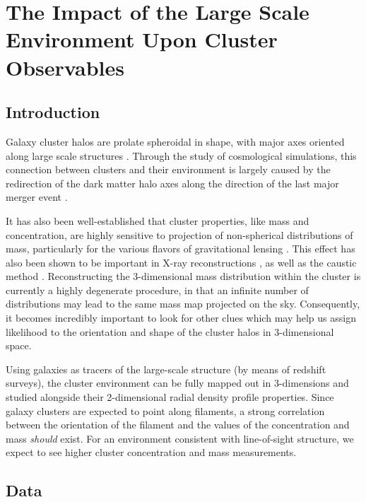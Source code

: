 \chapter[Clusters And The LSS Environment]{The Impact of the Large Scale Environment Upon Cluster Observables}

\section{Introduction}

Galaxy cluster halos are prolate spheroidal in shape, with major axes oriented
along large scale structures
\citep{CO05.1,KA05.1,BA06.1,AL06.1,AL06.2,AR07.1,BE07.1,ZH09.1,PA11.1}. Through
the study of cosmological simulations, this connection between clusters and
their environment is largely caused by the redirection of the dark matter halo
axes along the direction of the last major merger event \citep{VA93.1,SP97.1}.

It has also been well-established that cluster properties, like mass and
concentration, are highly sensitive to projection of non-spherical
distributions of mass, particularly for the various flavors of gravitational
lensing \citep{CN2007,SerenoEtAl2010b}. This effect has also 
been shown to be important in X-ray reconstructions
\citep{BU07.1,SC07.1,ET11.1}, as well as the caustic method
\citep{SV15.1}. Reconstructing the 3-dimensional mass distribution within the
cluster is currently a highly degenerate procedure, in that an infinite number
of distributions may lead to the same mass map projected on the
sky. Consequently, it becomes incredibly important to look for other clues
which may help us assign likelihood to the orientation and shape of the cluster
halos in 3-dimensional space.

Using galaxies as tracers of the large-scale structure (by means of redshift
surveys), the cluster environment can be fully mapped out in 3-dimensions and
studied alongside their 2-dimensional radial density profile properties. Since
galaxy clusters are expected to point along filaments, a strong correlation
between the orientation of the filament and the values of the concentration and
mass {\em should} exist. For an environment consistent with line-of-sight
structure, we expect to see higher cluster concentration and mass
measurements.


\section{Data}
 
